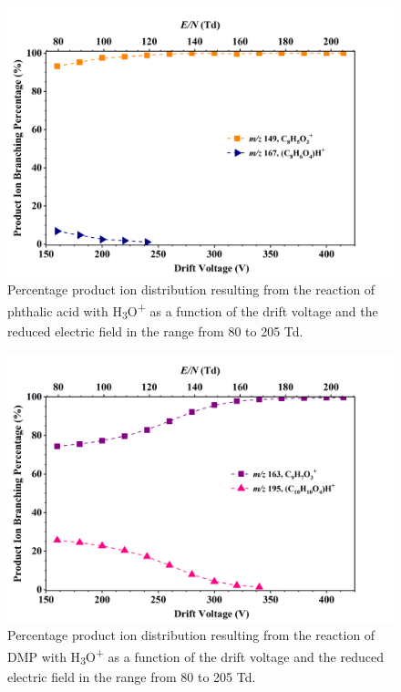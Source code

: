 \begin{figure}
\centering
\includegraphics[height=0.4\textheight]{pics/Pacid-BR.png}
\caption{Percentage product ion distribution resulting from the reaction of phthalic acid with H\textsubscript{3}O\textsuperscript{+} as a function of the drift voltage and the reduced electric field in the range from 80 to 205 Td.}
\label{fig:PAcid}
\end{figure}


\begin{figure}
\centering
\includegraphics[height=0.4\textheight]{pics/DMP-BR.png}
\caption{Percentage product ion distribution resulting from the reaction of DMP with H\textsubscript{3}O\textsuperscript{+} as a function of the drift voltage and the reduced electric field in the range from 80 to 205 Td.}
\label{fig:DMP_fs}
\end{figure}


